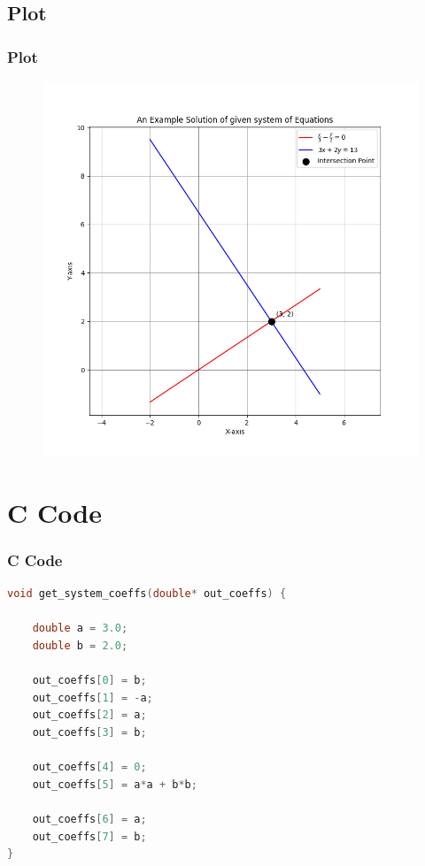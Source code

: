 \documentclass{beamer}
\theoremstyle{remark}
\numberwithin{equation}{section}
\begin{document}
\subsection{Plot}
\begin{frame}[fragile]
\frametitle{Plot}

\begin{figure}[h!]
   \centering
   \includegraphics[width=0.7\columnwidth]{figs/fig1.png}
	\caption{}
   \label{}
\end{figure}
\end{frame}

\section{C Code}
\begin{frame}[fragile]
\frametitle{C Code}
\begin{lstlisting}[language=C]
void get_system_coeffs(double* out_coeffs) {
 
    double a = 3.0;
    double b = 2.0;
   
    out_coeffs[0] = b;
    out_coeffs[1] = -a;
    out_coeffs[2] = a;
    out_coeffs[3] = b;
 
    out_coeffs[4] = 0;
    out_coeffs[5] = a*a + b*b;
 
    out_coeffs[6] = a;
    out_coeffs[7] = b;
}
    \end{lstlisting}
\end{frame}
\end{document}
